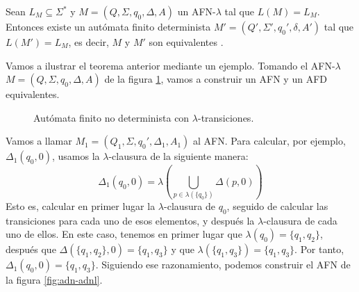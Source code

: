 \begin{teorema}Sean $L_M\subseteq\Sigma^*$ y $M=(Q,\Sigma,q_0,\Delta,A)$ un AFN-$\lambda$ tal que $L(M)=L_M$. Entonces
existe un autómata finito determinista $M'=(Q',\Sigma',q_0',\delta,A')$ tal que $L(M')=L_M$, es decir, $M$ y $M'$ son
equivalentes \cite{chakraborty_2003}.
\end{teorema}

Vamos a ilustrar el teorema anterior mediante un ejemplo. Tomando el AFN-$\lambda$ $M=(Q,\Sigma,q_0,\Delta,A)$ de la 
figura \ref{fig:adnlambda}, vamos a construir un AFN y un AFD equivalentes.

\begin{figure}[htbp!]
\centering
{}
\caption{Autómata finito no determinista con $\lambda$-transiciones.}\label{fig:adnlambda}
\end{figure}

Vamos a llamar $M_1=(Q_1,\Sigma,q_0',\Delta_1,A_1)$ al AFN. Para calcular, por ejemplo, $\Delta_1(q_0,0)$, usamos la 
$\lambda$-clausura de la siguiente manera:
\begin{equation}
    \Delta_1(q_0,0)=\lambda(\bigcup_{p\in\lambda(\{q_0\})}\Delta(p,0))
\end{equation}
Esto es, calcular en primer lugar la $\lambda$-clausura de $q_0$, seguido de calcular las transiciones para cada uno
de esos elementos, y después la $\lambda$-clausura de cada uno de ellos. En este caso, tenemos en primer lugar que
$\lambda(q_0)=\{q_1,q_2\}$, después que $\Delta(\{q_1,q_2\},0)=\{q_1,q_3\}$ y que $\lambda(\{q_1,q_3\})=\{q_1,q_3\}$.
Por tanto, $\Delta_1(q_0,0)=\{q_1,q_3\}$. Siguiendo ese razonamiento, podemos construir el AFN de la figura
\ref{fig:adn-adnl}.

